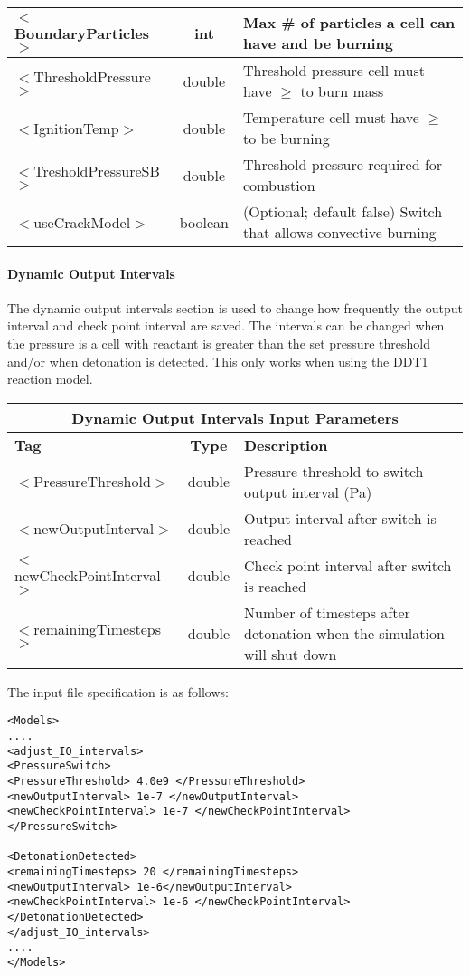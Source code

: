 \begin{center}
\begin{tabular}{| l | c | p{7cm} |}
\hline
  $<$BoundaryParticles$>$ & int & Max \# of particles a cell can have and be burning  \\
\hline
  $<$ThresholdPressure$>$ & double & Threshold pressure cell must have $\ge$ to burn mass \\
\hline
  $<$IgnitionTemp$>$ & double & Temperature cell must have $\ge$ to be burning \\
\hline
  $<$TresholdPressureSB$>$ & double & Threshold pressure required for combustion \\
\hline
  $<$useCrackModel$>$ & boolean & (Optional; default false) Switch that allows convective burning \\
\hline
\end{tabular}
\end{center}



\newpage
\paragraph{Dynamic Output Intervals} \label {Sec:DDT2}
The dynamic output intervals section is used to change how frequently the output interval and check point interval are saved. The intervals can be changed when the pressure is a cell with reactant is greater than the set pressure threshold and/or when detonation is detected. This only works when using the DDT1 reaction model.


\begin{center}
\begin{tabular}{| l | c | p{7cm} |}
\hline
  \multicolumn{3}{|c|}{\textbf{Dynamic Output Intervals Input Parameters}} \\
\hline
\hline
  \textbf{Tag} & \textbf{Type} & \textbf{Description}\\
\hline
  $<$PressureThreshold$>$ & double & Pressure threshold to switch output interval (Pa)\\
\hline
  $<$newOutputInterval$>$ & double & Output interval after switch is reached\\
\hline
  $<$newCheckPointInterval$>$ & double & Check point interval after switch is reached\\
\hline
  $<$remainingTimesteps$>$ & double & Number of timesteps after detonation when the simulation will shut down\\
\hline
\end{tabular}
\end{center}


The input file specification is as follows:
\begin{verbatim}
<Models>
....
<adjust_IO_intervals>
<PressureSwitch>
<PressureThreshold> 4.0e9 </PressureThreshold>
<newOutputInterval> 1e-7 </newOutputInterval>
<newCheckPointInterval> 1e-7 </newCheckPointInterval>
</PressureSwitch>

<DetonationDetected>
<remainingTimesteps> 20 </remainingTimesteps>
<newOutputInterval> 1e-6</newOutputInterval>
<newCheckPointInterval> 1e-6 </newCheckPointInterval>
</DetonationDetected>
</adjust_IO_intervals>
....
</Models> 
\end{verbatim}

